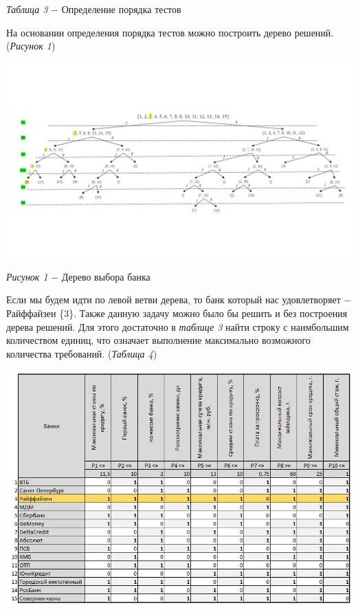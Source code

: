 \documentclass[14pt,fleqn]{extarticle}
\begin{document}
	\begin{center}
		\textit{Таблица 3} $-$ Определение порядка тестов
	\end{center}
	На основании определения порядка тестов можно построить дерево решений. (\textit{Рисунок 1})
	\begin{center}
		\includegraphics[scale=0.54]{4}
	\end{center}
	\begin{center}
		\textit{Рисунок 1} $-$ Дерево выбора банка
	\end{center}
	Если мы будем идти по левой ветви дерева, то банк который нас удовлетворяет $-$ Райффайзен \{3\}.
	Также данную задачу можно было бы решить и без построения дерева решений. Для этого достаточно в \textit{таблице 3} найти строку с наимбольшим количеством единиц, что означает выполнение максимально возможного количества требований. (\textit{Таблица 4})
	\newpage
	\begin{center}
		\includegraphics[scale=0.54]{5}
	\end{center}
\end{document}
